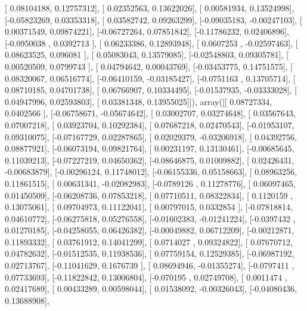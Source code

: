 \documentclass{article}
\begin{document}
       [ 0.08104188,  0.12757312],
       [ 0.02352563,  0.13622026],
       [ 0.00581934,  0.13524998],
       [-0.05823269,  0.03353318],
       [ 0.03582742,  0.09263299],
       [-0.09035183, -0.00247103],
       [ 0.00371549,  0.09874221],
       [-0.06727264,  0.07851842],
       [-0.11786232,  0.02406896],
       [-0.0950038 ,  0.0392713 ],
       [ 0.06233386,  0.12893948],
       [ 0.0607253 , -0.02597463],
       [ 0.08623525,  0.096081  ],
       [ 0.05083043,  0.13579085],
       [-0.02548803,  0.09305781],
       [ 0.00520509,  0.0799743 ],
       [ 0.04794642,  0.00043769],
       [-0.03453775,  0.14751575],
       [ 0.08320067,  0.06516774],
       [-0.06410159, -0.03185427],
       [-0.0751163 ,  0.13705714],
       [ 0.08710185,  0.04701738],
       [ 0.06766907,  0.10334495],
       [-0.01537935, -0.03333028],
       [ 0.04947996,  0.02593803],
       [ 0.03381348,  0.13955025]]), array([[ 0.08727334,  0.0402566 ],
       [-0.06758671, -0.05674642],
       [ 0.03002707,  0.03274648],
       [ 0.03567643,  0.07007218],
       [ 0.03923704,  0.10292384],
       [ 0.07687218,  0.02470543],
       [-0.01953107,  0.09310075],
       [-0.07167729,  0.02287865],
       [ 0.02029379, -0.03206918],
       [ 0.04392756,  0.08877921],
       [-0.06073194,  0.09821764],
       [ 0.00231197,  0.13130461],
       [-0.00685645,  0.11039213],
       [-0.07227219,  0.04650362],
       [-0.08646875,  0.01009882],
       [ 0.02426431, -0.00683879],
       [-0.00296124,  0.11748012],
       [-0.06155336,  0.05158663],
       [ 0.08963256,  0.11861515],
       [ 0.00631341, -0.02082983],
       [-0.0789126 ,  0.11278776],
       [ 0.06097465,  0.01450509],
       [-0.06208736,  0.07853218],
       [ 0.07710511,  0.08322834],
       [ 0.1120159 ,  0.13075061],
       [ 0.09704973,  0.11122041],
       [ 0.00797015,  0.0332854 ],
       [-0.07818814,  0.04610772],
       [-0.06275818,  0.05276558],
       [-0.01602383, -0.01241224],
       [-0.0397432 ,  0.01270185],
       [-0.04258055,  0.06426382],
       [-0.00049882,  0.06712209],
       [-0.00212871,  0.11893332],
       [ 0.03761912,  0.14041299],
       [ 0.0714027 ,  0.09324822],
       [ 0.07670712,  0.04782632],
       [-0.01512535,  0.11938536],
       [ 0.07759154,  0.12529385],
       [-0.06987192,  0.02713767],
       [-0.11041629,  0.1676739 ],
       [ 0.08694946, -0.01355274],
       [-0.0797411 ,  0.07733693],
       [-0.11822842,  0.13006804],
       [-0.070195  ,  0.02749708],
       [ 0.0011474 ,  0.02417689],
       [ 0.00433289,  0.00598044],
       [ 0.01538092, -0.00326043],
       [-0.04080436,  0.13688908],
\end{document}

